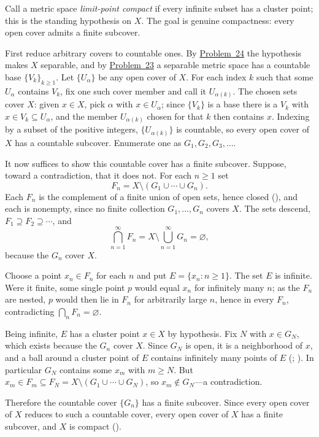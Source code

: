 \documentclass[main.tex]{subfiles}
\begin{document}
\begin{SolutionBlue}
Call a metric space \emph{limit-point compact} if every infinite subset has a cluster point; this is the
standing hypothesis on $X$. The goal is genuine compactness: every open cover admits a finite subcover.

First reduce arbitrary covers to countable ones. By \hyperlink{prob:24}{Problem~24} the hypothesis makes
$X$ separable, and by \hyperlink{prob:23}{Problem~23} a separable metric space has a countable base
$\{V_k\}_{k\ge 1}$. Let $\{U_\alpha\}$ be any open cover of $X$. For each index $k$ such that some
$U_\alpha$ contains $V_k$, fix one such cover member and call it $U_{\alpha(k)}$. The chosen sets cover
$X$: given $x\in X$, pick $\alpha$ with $x\in U_\alpha$; since $\{V_k\}$ is a base there is a $V_k$ with
$x\in V_k\subseteq U_\alpha$, and the member $U_{\alpha(k)}$ chosen for that $k$ then contains $x$.
Indexing by a subset of the positive integers, $\{U_{\alpha(k)}\}$ is countable, so every open cover of
$X$ has a countable subcover. Enumerate one as $G_1,G_2,G_3,\ldots$.

It now suffices to show this countable cover has a finite subcover. Suppose, toward a contradiction, that
it does not. For each $n\ge 1$ set
\[
  F_n=X\setminus(G_1\cup\cdots\cup G_n).
\]
Each $F_n$ is the complement of a finite union of open sets, hence closed (), and each is
nonempty, since no finite collection $G_1,\ldots,G_n$ covers $X$. The sets descend,
$F_1\supseteq F_2\supseteq\cdots$, and
\[
  \bigcap_{n=1}^{\infty}F_n=X\setminus\bigcup_{n=1}^{\infty}G_n=\varnothing,
\]
because the $G_n$ cover $X$.

Choose a point $x_n\in F_n$ for each $n$ and put $E=\{x_n:n\ge 1\}$. The set $E$ is infinite. Were it
finite, some single point $p$ would equal $x_n$ for infinitely many $n$; as the $F_n$ are nested, $p$
would then lie in $F_n$ for arbitrarily large $n$, hence in every $F_n$, contradicting
$\bigcap_n F_n=\varnothing$.

Being infinite, $E$ has a cluster point $x\in X$ by hypothesis. Fix $N$ with $x\in G_N$, which exists
because the $G_n$ cover $X$. Since $G_N$ is open, it is a neighborhood of $x$, and a ball around a
cluster point of $E$ contains infinitely many points of $E$
(; ). In particular $G_N$ contains some $x_m$ with
$m\ge N$. But $x_m\in F_m\subseteq F_N=X\setminus(G_1\cup\cdots\cup G_N)$, so $x_m\notin G_N$---a
contradiction.

Therefore the countable cover $\{G_n\}$ has a finite subcover. Since every open cover of $X$ reduces to
such a countable cover, every open cover of $X$ has a finite subcover, and $X$ is compact ().
\end{SolutionBlue}
\end{document}
